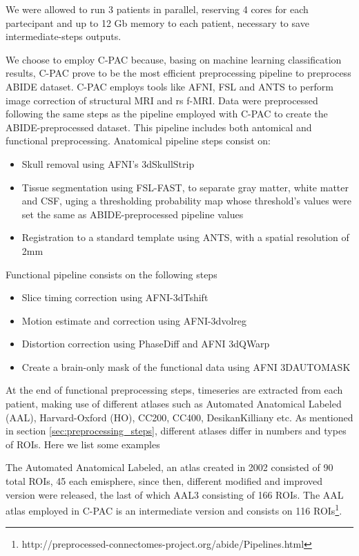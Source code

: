 \documentclass[10pt]{report}
\begin{document}
We were allowed to run 3 patients in parallel, reserving 4 cores for each partecipant and up to 12 Gb memory to each patient, necessary to save intermediate-steps outputs.

We choose to employ C-PAC because, basing on machine learning classification results, \cite{yang2020} C-PAC prove to be the most efficient preprocessing pipeline to preprocess ABIDE dataset.
C-PAC employs tools like AFNI, FSL and ANTS to perform image correction of structural MRI and rs f-MRI.
Data were preprocessed following the same steps as the pipeline employed with C-PAC to create the ABIDE-preprocessed dataset.
This pipeline includes both antomical and functional preprocessing.
Anatomical pipeline steps consist on:
\begin{itemize}
\item Skull removal using AFNI's 3dSkullStrip
\item Tissue segmentation using FSL-FAST, to separate gray matter, white matter and CSF, uging a thresholding probability map whose threshold's values were set the same as ABIDE-preprocessed pipeline values
\item Registration to a standard template using ANTS, with a spatial resolution of 2mm
\end{itemize}
Functional pipeline consists on the following steps
\begin{itemize}
\item Slice timing correction using AFNI-3dTshift
\item Motion estimate and correction using AFNI-3dvolreg
\item Distortion correction using PhaseDiff and AFNI 3dQWarp
\item Create a brain-only mask of the functional data using AFNI 3DAUTOMASK
\end{itemize}

\hfill

At the end of functional preprocessing steps, timeseries are extracted from each patient, making use of different atlases such as Automated Anatomical Labeled (AAL), Harvard-Oxford (HO), CC200, CC400, DesikanKilliany etc.
As mentioned in section \ref{sec:preprocessing_steps}, different atlases differ in numbers and types of ROIs. Here we list some examples

The Automated Anatomical Labeled, an atlas created in 2002 \cite{mazoyer-2002} consisted of 90 total ROIs, 45 each emisphere, since then, different modified and improved version were released, the last of which AAL3 consisting of 166 ROIs. The AAL atlas employed in C-PAC is an intermediate version and consists on 116 ROIs\footnote{http://preprocessed-connectomes-project.org/abide/Pipelines.html}.
\end{document}
